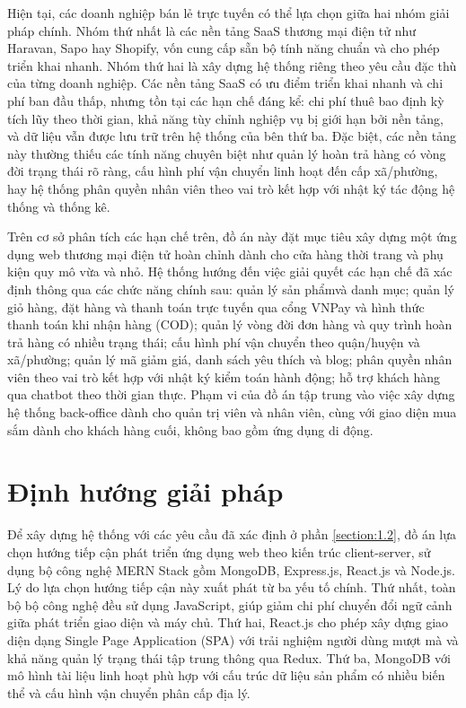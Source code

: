 \documentclass[../DoAn.tex]{subfiles}
\begin{document}
  Hiện tại, các doanh nghiệp bán lẻ trực tuyến có thể lựa chọn giữa hai nhóm giải
  pháp chính. Nhóm thứ nhất là các nền tảng SaaS thương mại điện tử như Haravan,
  Sapo hay Shopify, vốn cung cấp sẵn bộ tính năng chuẩn và cho phép triển khai nhanh.
  Nhóm thứ hai là xây dựng hệ thống riêng theo yêu cầu đặc thù của từng doanh nghiệp.
  Các nền tảng SaaS có ưu điểm triển khai nhanh và chi phí ban đầu thấp, nhưng tồn
  tại các hạn chế đáng kể: chi phí thuê bao định kỳ tích lũy theo thời gian, khả năng
  tùy chỉnh nghiệp vụ bị giới hạn bởi nền tảng, và dữ liệu vẫn được lưu trữ trên
  hệ thống của bên thứ ba. Đặc biệt, các nền tảng này thường thiếu các tính năng
  chuyên biệt như quản lý hoàn trả hàng có vòng đời trạng thái rõ ràng, cấu hình
  phí vận chuyển linh hoạt đến cấp xã/phường, hay hệ thống phân quyền nhân viên
  theo vai trò kết hợp với nhật ký tác động hệ thống và thống kê.

  Trên cơ sở phân tích các hạn chế trên, đồ án này đặt mục tiêu xây dựng một ứng
  dụng web thương mại điện tử hoàn chỉnh dành cho cửa hàng thời trang và phụ kiện
  quy mô vừa và nhỏ. Hệ thống hướng đến việc giải quyết các hạn chế đã xác định
  thông qua các chức năng chính sau: quản lý sản phẩmvà danh mục; quản lý giỏ hàng, đặt hàng và thanh toán trực tuyến qua
  cổng VNPay và hình thức thanh toán khi nhận hàng (COD); quản lý vòng đời đơn hàng
  và quy trình hoàn trả hàng có nhiều trạng thái; cấu hình phí vận chuyển theo
  quận/huyện và xã/phường; quản lý mã giảm giá, danh sách yêu thích và blog;
  phân quyền nhân viên theo vai trò kết hợp với nhật ký kiểm toán hành động;
  hỗ trợ khách hàng qua chatbot theo thời gian thực. Phạm vi của đồ án tập trung
  vào việc xây dựng hệ thống back-office dành cho quản trị viên và nhân viên,
  cùng với giao diện mua sắm dành cho khách hàng cuối, không bao gồm ứng dụng di động.

  \section{Định hướng giải pháp}
  \label{section:1.3}

  Để xây dựng hệ thống với các yêu cầu đã xác định ở phần \ref{section:1.2}, đồ
  án lựa chọn hướng tiếp cận phát triển ứng dụng web theo kiến trúc client-server,
  sử dụng bộ công nghệ MERN Stack gồm MongoDB, Express.js, React.js và Node.js.
  Lý do lựa chọn hướng tiếp cận này xuất phát từ ba yếu tố chính. Thứ nhất, toàn
  bộ bộ công nghệ đều sử dụng JavaScript, giúp giảm chi phí chuyển đổi ngữ cảnh
  giữa phát triển giao diện và máy chủ. Thứ hai, React.js cho phép xây dựng giao
  diện dạng Single Page Application (SPA) với trải nghiệm người dùng mượt mà và
  khả năng quản lý trạng thái tập trung thông qua Redux. Thứ ba, MongoDB với mô
  hình tài liệu linh hoạt phù hợp với cấu trúc dữ liệu sản phẩm có nhiều biến thể
  và cấu hình vận chuyển phân cấp địa lý.
\end{document}
